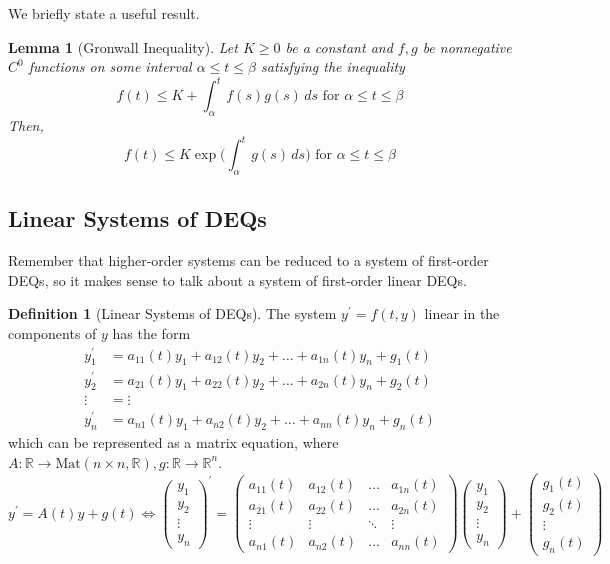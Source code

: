 \documentclass{article}
\newtheorem{lemma}[theorem]{Lemma}
\theoremstyle{remark}
\theoremstyle{definition}
\newtheorem{definition}{Definition}[section]
\begin{document}
    We briefly state a useful result. 

    \begin{lemma}[Gronwall Inequality]
    Let $K \geq 0$ be a constant and $f, g$ be nonnegative $C^0$ functions on some interval $\alpha \leq t \leq \beta$ satisfying the inequality
    \[f(t) \leq K + \int_\alpha^t f(s) g(s) \, ds \text{ for } \alpha \leq t \leq \beta\]
    Then, 
    \[f(t) \leq K \exp \bigg( \int_{\alpha}^t g(s) \,ds \bigg) \text{ for } \alpha \leq t \leq \beta\]
    \end{lemma}

  \subsection{Linear Systems of DEQs}

    Remember that higher-order systems can be reduced to a system of first-order DEQs, so it makes sense to talk about a system of first-order linear DEQs. 

    \begin{definition}[Linear Systems of DEQs]
    The system $y^\prime = f(t, y)$ linear in the components of $y$ has the form 
    \begin{align*}
        y_1^\prime & = a_{11}(t) y_1 + a_{12}(t) y_2 + \ldots + a_{1n}(t) y_n + g_1 (t) \\
        y_2^\prime & = a_{21}(t) y_1 + a_{22}(t) y_2 + \ldots + a_{2n}(t) y_n + g_2 (t) \\
        \vdots & = \vdots \\
        y_n^\prime & = a_{n1}(t) y_1 + a_{n2}(t) y_2 + \ldots + a_{nn}(t) y_n + g_n (t)
    \end{align*}
    which can be represented as a matrix equation, where $A: \mathbb{R} \longrightarrow \text{Mat}(n \times n, \mathbb{R}), g: \mathbb{R} \longrightarrow \mathbb{R}^n$. 
    \[y^\prime = A(t) y + g(t) \iff \begin{pmatrix}
    y_1 \\ y_2 \\ \vdots \\ y_n
    \end{pmatrix}^\prime = \begin{pmatrix}
    a_{11}(t) & a_{12} (t) & \ldots & a_{1n}(t) \\
    a_{21}(t) & a_{22} (t) & \ldots & a_{2n}(t) \\
    \vdots & \vdots & \ddots & \vdots \\
    a_{n1}(t) & a_{n2} (t) & \ldots & a_{nn}(t) 
    \end{pmatrix} \begin{pmatrix}
    y_1 \\ y_2 \\ \vdots \\ y_n
    \end{pmatrix} + \begin{pmatrix}
    g_1 (t) \\ g_2 (t) \\ \vdots \\ g_n (t) 
    \end{pmatrix}\]
    \end{definition}
\end{document}
